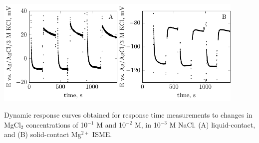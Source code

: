 \documentclass{beamer}
\begin{document}
\begin{frame}
	\centering
\includegraphics[width=0.45\textwidth]{phd-figure10.pdf}\hfill \includegraphics[width=0.45\textwidth]{phd-figure11.pdf}

\vfill

Dynamic response curves obtained for response time measurements to changes in MgCl$_2$ concentrations of 10$^{-1}$ M and 10$^{-2}$ M, in 10$^{-3}$ M NaCl.
(A) liquid-contact, and (B) solid-contact Mg$^{2+}$ ISME.
\end{frame}
\end{document}
